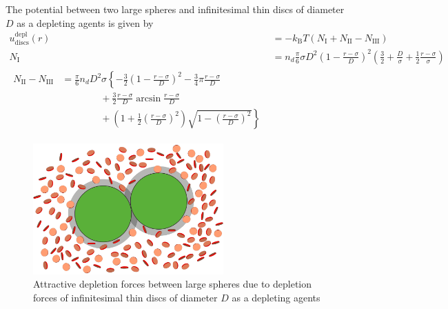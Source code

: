 The potential between two large spheres and infinitesimal thin discs of diameter $D$
as a depleting agents is given by
\begin{align}
u^\text{depl}_\text{discs}(r) &= -k_\text{B} T (N_\text{I}+N_\text{II}-N_\text{III}) \\
N_\text{I} &= n_d \frac{\pi}{6}\sigma D^2 \left(1-\frac{r-\sigma}{D}\right)^2
                \left(\frac{3}{2}+\frac{D}{\sigma}+\frac{1}{2}\frac{r-\sigma}{\sigma}\right)\\
\begin{split}
N_\text{II} - N_\text{III} &= \frac{\pi}{6} n_d D^2\sigma
                              \left\{ -\frac{3}{2}\left(1-\frac{r-\sigma}{D}\right)^2
                                      -\frac{3}{4}\pi\frac{r-\sigma}{D} \right. \\
                           & \qquad \qquad + \frac{3}{2}\frac{r-\sigma}{D} \arcsin \frac{r-\sigma}{D}  \\
                           & \qquad \qquad + \left.
                              \left(1+\frac{1}{2}\left(\frac{r-\sigma}{D}\right)^2\right)
                                   \sqrt{1-\left(\frac{r-\sigma}{D}\right)^2}
                              \right\}
\end{split}
\end{align}


\begin{figure}[htb]
\includegraphics[width=0.65\textwidth]{../images/OZsolver/potentials/DepletionSketchSphDiscs.png}  \caption{Attractive depletion forces between large spheres due to depletion forces of infinitesimal thin discs of diameter $D$ as a depleting agents}
\end{figure}

